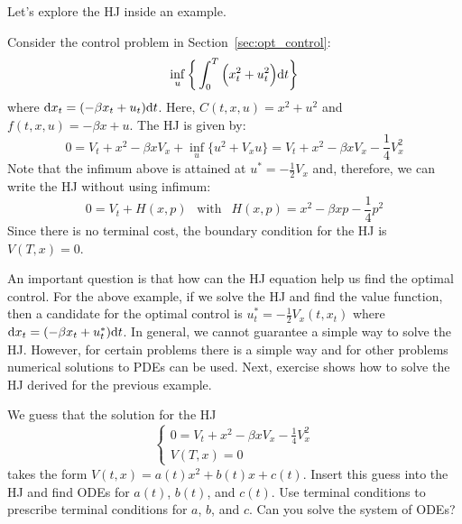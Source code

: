 \documentclass[11pt]{book}
\newcommand{\dt}{\text{\normalfont d}t}
\newcommand{\dx}{\text{\normalfont d}x}
\begin{document}
Let's explore the HJ inside an example.
\begin{eg}
    Consider the control problem in Section~\ref{sec:opt_control}:
\begin{equation}
\inf_{u}\bigg\{\int_0^T\Big(x_t^2 +u_t^2\Big) {{\dt}}\bigg\}
\end{equation}
where ${\dx}_t = (-\beta x_t + u_t ){{\dt}}$.
Here, $C(t,x,u)=x^2 + u^2$ and $f(t,x,u)=-\beta x + u$.
The HJ is given by:
\[
0 = V_t + x^2 -\beta x V_x + \inf_{u} \{u^2 + V_x u\}=V_t + x^2 -\beta x V_x -\frac14 V_x^2 
\]
Note that the infimum above is attained at $u^*=-\frac12V_x$ and, therefore, we can write the HJ without using infimum:
\[
0 = V_t + H(x,p) ~~\text{ with }~~ H(x,p)=x^2 -\beta x p -\frac14 p^2 
\]
Since there is no terminal cost, the boundary condition for the HJ is $V(T,x)=0$. 
\end{eg}
An important question is that how can the HJ equation help us find the optimal control. For the above example, if we solve the HJ and find the value function, then a candidate for the optimal control is $u_t^*=-\frac12V_x(t,x_t)$ where ${\dx}_t = (-\beta x_t + u_t^* ){{\dt}}$. In general, we cannot guarantee a simple way to solve the HJ. However, for certain problems there is a simple way and for other problems numerical solutions to PDEs can be used. Next, exercise shows how to solve the HJ derived for the previous example.
\begin{ex}\label{ex:lq_solution}
    We guess that the solution for the HJ
    \[
    \begin{cases}
    0 = V_t + x^2 -\beta x V_x -\frac14 V_x^2 \\
    V(T,x)=0
    \end{cases}
    \]
    takes the form $V(t,x)=a(t)x^2+b(t)x+c(t)$. Insert this guess into the HJ and find ODEs for $a(t)$, $b(t)$, and $c(t)$. Use terminal conditions to prescribe terminal conditions for $a$, $b$, and $c$. Can you solve the system of ODEs?
\end{ex}
\end{document}

